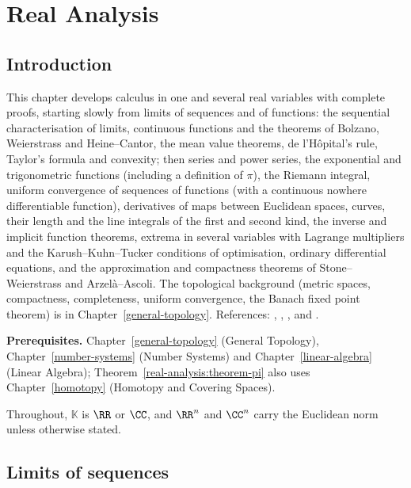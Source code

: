 \chapter{Real Analysis}\label{real-analysis}

\section{Introduction}\label{real-analysis:section-introduction}

This chapter develops calculus in one and several real variables with complete proofs, starting slowly from limits of sequences and of functions: the sequential characterisation of limits,
continuous functions and the theorems of Bolzano, Weierstrass and Heine--Cantor, the mean value theorems, de l'H\^opital's rule, Taylor's formula and convexity;
then series and power series, the exponential
and trigonometric functions (including a definition of $\pi$), the Riemann integral, uniform convergence of sequences of functions (with a continuous nowhere differentiable function), derivatives of maps between Euclidean spaces, curves, their length and the line integrals of the first and second kind,
the inverse and implicit function theorems, extrema in several variables with Lagrange multipliers and the Karush--Kuhn--Tucker conditions of optimisation, ordinary differential equations, and the approximation and compactness theorems of
Stone--Weierstrass and Arzel\`a--Ascoli. The topological background (metric spaces, compactness, completeness, uniform convergence,
the Banach fixed point theorem) is in Chapter~\ref{general-topology}. References: \cite{rudin-principles}, \cite{dieudonne-foundations},
\cite{spivak-calculus-manifolds}, \cite{lang-real-functional} and \cite{hartman-ode}.

\noindent\textbf{Prerequisites.} Chapter~\ref{general-topology} (General Topology), Chapter~\ref{number-systems} (Number Systems) and
Chapter~\ref{linear-algebra} (Linear Algebra); Theorem~\ref{real-analysis:theorem-pi} also uses Chapter~\ref{homotopy} (Homotopy and Covering Spaces).

Throughout, $\mathbb{K}$ is $\RR$ or $\CC$, and $\RR^n$ and $\CC^n$ carry the Euclidean norm unless otherwise stated.

\section{Limits of sequences}\label{real-analysis:section-sequences}

